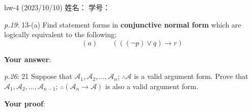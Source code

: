 \documentclass[UTF8,12pt,a4paper]{ctexart}
\begin{document}
	

\begin{center}
hw-4 (2023/10/10) \qquad\qquad 姓名：  \hspace{7em}  学号： 
\end{center}

\emph{p.19}: 13-(a) \quad
Find statement forms in \textbf{conjunctive normal form} which are logically equivalent to the following:
\[
(a) \qquad (((\neg p)  \lor q) \to r)
\] 


\textbf{Your answer}:












\vspace{13cm}  %

\emph{p.26}: 21 \quad
Suppose that $\mathscr{A}_1,\mathscr{A}_2,\dots,\mathscr{A}_n$;  $\therefore\mathscr{A}$ is a valid argument form. Prove that $\mathscr{A}_1,\mathscr{A}_2,\dots,\mathscr{A}_{n-1}$;  $\therefore (\mathscr{A}_n \to \mathscr{A})$ is also a valid argument form.

\textbf{Your proof}:





















\end{document}
